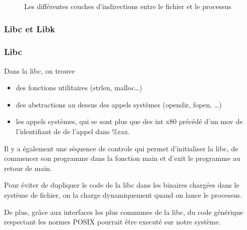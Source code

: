 \documentclass[10pt,a4paper]{beamer}
\begin{document}
\begin{frame}
  \begin{figure}
    \caption{Les différentes couches d'indirections entre le fichier et le processus}
  \end{figure}
\end{frame}

\begin{frame}
  \frametitle{Libc et Libk}

\end{frame}

\begin{frame}
  \frametitle{Libc}
  Dans la libc, on trouve
  \begin{itemize}
  \item des fonctions utilitaires (\textrm{strlen}, \textrm{malloc}\ldots)
  \item des abstractions au dessus des appels systèmes (\textrm{opendir}, \textrm{fopen}, \ldots)
  \item les appels systèmes, qui se sont plus que des \textrm{int x80} précédé d'un \textrm{mov} de l'identifiant de de l'appel dans \textrm{\%rax}.
  \end{itemize}

  Il y a également une séquence de controle qui permet d'initialiser la libc, de commencer son programme dans la fonction \textrm{main} et d'\textrm{exit} le programme au retour  de \textrm{main}.

  Pour éviter de dupliquer le code de la libc dans les binaires chargées dans le système de fichier, on la charge dynamiquement quand on lance le processus.

  De plus, grâce aux interfaces les plus communes de la libc, du code générique respectant les normes \textrm{POSIX} pourrait être executé sur notre système.

\end{frame}
\end{document}
